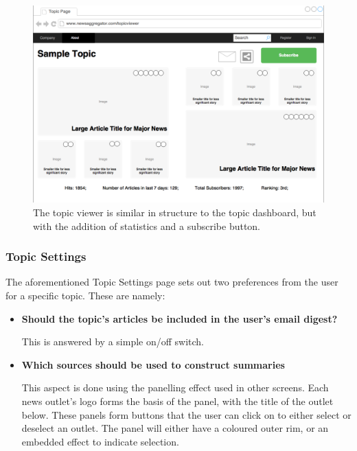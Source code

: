 \documentclass[12pt]{article}
\begin{document}
\begin{figure}[ht!]
  \centering
    \includegraphics[scale=0.3]{TopicViewer.png}
   \caption[A wireframe of the Topic Viewer]{The topic viewer is similar in structure to the topic dashboard, but with the addition of statistics and a subscribe button.}
   \label{topicViewer}
\end{figure}

\subsubsection{Topic Settings}

The aforementioned Topic Settings page sets out two preferences from the user for a specific topic. These are namely: \\

\begin{itemize}
	\item \textbf{Should the topic's articles be included in the user's email digest?}
	
	This is answered by a simple on/off switch. \\
	
	\item \textbf{Which sources should be used to construct summaries}
	
	This aspect is done using the panelling effect used in other screens. Each news outlet's logo forms the basis of the panel, with the title of the outlet below. These panels form buttons that the user can click on to either select or deselect an outlet. The panel will either have a coloured outer rim, or an embedded effect to indicate selection. \\
\end{itemize}
\end{document}
